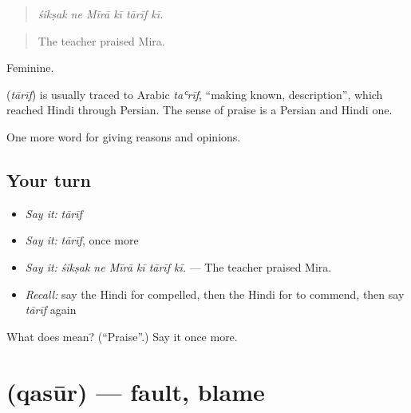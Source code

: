 \begin{quote}
     
\end{quote}

\begin{quote}
\emph{śikṣak ne Mīrā kī tārīf kī.}
\end{quote}

\begin{quote}
The teacher praised Mira.
\end{quote}

Feminine.

\begin{cousinweb}
\textbf{} (\emph{tārīf}) is usually traced to Arabic \emph{taʿrīf}, \textquotedblleft{}making known, description\textquotedblright{}, which reached Hindi through Persian. The sense of praise is a Persian and Hindi one.
\end{cousinweb}

\begin{grammarlens}[title={What you've built}]
One more word for giving reasons and opinions.
\end{grammarlens}

\subsection*{Your turn}
\begin{itemize}
\raggedright
  \item \emph{Say it:} \emph{tārīf}
  \item \emph{Say it:} \emph{tārīf}, once more
  \item \emph{Say it:} \emph{śikṣak ne Mīrā kī tārīf kī.} — The teacher praised Mira.
  \item \emph{Recall:} say the Hindi for compelled, then the Hindi for to commend, then say \emph{tārīf} again
\end{itemize}

\begin{tcolorbox}[breakable,colback=teal!4,colframe=teal!35!black,title={Before you move on}]
What does  mean? (\textquotedblleft{}Praise\textquotedblright{}.) Say it once more.
\end{tcolorbox}
\section[\texorpdfstring{\hi{क़सूर} (qasūr)}{क़सूर (qasūr)}]{ (qasūr) — fault, blame}

